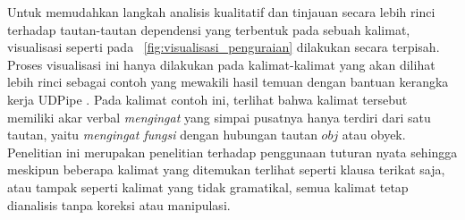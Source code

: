 Untuk memudahkan langkah analisis kualitatif dan tinjauan secara lebih rinci terhadap tautan-tautan dependensi yang terbentuk pada sebuah kalimat, visualisasi seperti pada \pic~\ref{fig:visualisasi_penguraian} dilakukan secara terpisah. Proses visualisasi ini hanya dilakukan pada kalimat-kalimat yang akan dilihat lebih rinci sebagai contoh yang mewakili hasil temuan dengan bantuan kerangka kerja UDPipe \citep{udpipe2017}. Pada kalimat contoh ini, terlihat bahwa kalimat tersebut memiliki akar verbal \textit{mengingat} yang simpai pusatnya hanya terdiri dari satu tautan, yaitu \textit{mengingat fungsi} dengan hubungan tautan $obj$ atau obyek. Penelitian ini merupakan penelitian terhadap penggunaan tuturan nyata sehingga meskipun beberapa kalimat yang ditemukan terlihat seperti klausa terikat saja, atau tampak seperti kalimat yang tidak gramatikal, semua kalimat tetap dianalisis tanpa koreksi atau manipulasi.

